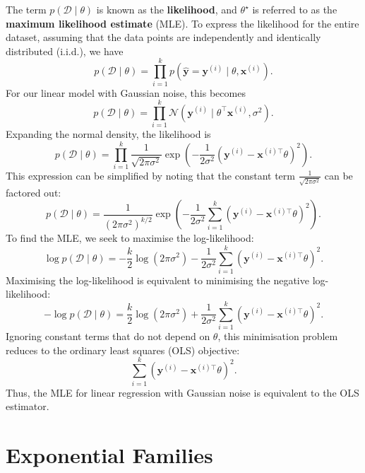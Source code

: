 The term \( p(\mathcal{D} \mid \theta) \) is known as the \textbf{likelihood}, and \( \theta^{\star} \) is referred to as the \textbf{maximum likelihood estimate} (MLE). To express the likelihood for the entire dataset, assuming that the data points are independently and identically distributed (i.i.d.), we have
\[
    p(\mathcal{D} \mid \theta) = \prod_{i=1}^{k} p(\hat{\mathbf{y}} = \boldsymbol{y}^{(i)} \mid \theta, \boldsymbol{x}^{(i)}).
\]
For our linear model with Gaussian noise, this becomes
\[
    p(\mathcal{D} \mid \theta) = \prod_{i=1}^{k} \mathcal{N}(\boldsymbol{y}^{(i)} \mid \theta^\top \boldsymbol{x}^{(i)}, \sigma^2).
\]
Expanding the normal density, the likelihood is
\[
    p(\mathcal{D} \mid \theta) = \prod_{i=1}^{k} \frac{1}{\sqrt{2\pi\sigma^2}} \exp\left( -\frac{1}{2\sigma^2} (\mathbf{y}^{(i)} - \boldsymbol{x}^{(i)\top}\theta)^2 \right).
\]
This expression can be simplified by noting that the constant term \( \frac{1}{\sqrt{2\pi\sigma^2}} \) can be factored out:
\[
    p(\mathcal{D} \mid \theta) = \frac{1}{(2\pi\sigma^2)^{k/2}} \exp\left( -\frac{1}{2\sigma^2} \sum_{i=1}^{k} (\mathbf{y}^{(i)} - \boldsymbol{x}^{(i)\top}\theta)^2 \right).
\]
To find the MLE, we seek to maximise the log-likelihood:
\[
    \log p(\mathcal{D} \mid \theta) = -\frac{k}{2} \log(2\pi\sigma^2) - \frac{1}{2\sigma^2} \sum_{i=1}^{k} (\boldsymbol{y}^{(i)} - \boldsymbol{x}^{(i)\top}\theta)^2.
\]
Maximising the log-likelihood is equivalent to minimising the negative log-likelihood:
\[
    -\log p(\mathcal{D} \mid \theta) = \frac{k}{2} \log(2\pi\sigma^2) + \frac{1}{2\sigma^2} \sum_{i=1}^{k} (\boldsymbol{y}^{(i)} - \boldsymbol{x}^{(i)\top}\theta)^2.
\]
Ignoring constant terms that do not depend on \( \theta \), this minimisation problem reduces to the ordinary least squares (OLS) objective:
\[
    \sum_{i=1}^{k} (\boldsymbol{y}^{(i)} - \boldsymbol{x}^{(i)\top}\theta)^2.
\]
Thus, the MLE for linear regression with Gaussian noise is equivalent to the OLS estimator.



\section{Exponential Families}

